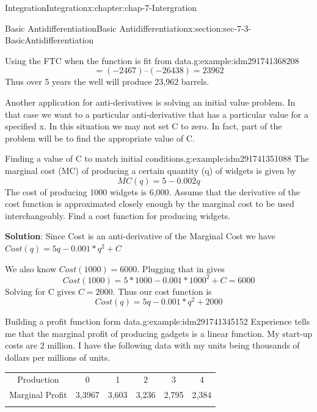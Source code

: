 \documentclass[oneside,10pt,]{book}
\newcommand{\tabularfont}{\relax}
\newcommand{\terminology}[1]{\textbf{#1}}
\numberwithin{equation}{section}
\newcommand{\hrulethin}  {\noalign{\hrule height 0.04em}}
\newcommand{\hrulemedium}{\noalign{\hrule height 0.07em}}
\newcommand{\hrulethick} {\noalign{\hrule height 0.11em}}
\begin{document}
\begin{chapterptx}{Integration}{}{Integration}{}{}{x:chapter:chap-7-Intergration}
\begin{sectionptx}{Basic Antidifferentiation}{}{Basic Antidifferentiation}{}{}{x:section:sec-7-3-BasicAntidifferentiation}
\begin{example}{Using the FTC when the function is fit from data.}{g:example:idm291741368208}
\begin{equation*}
\end{equation*}
%
\begin{equation*}
= (-2467) – (-26438) = 23962
\end{equation*}
Thus over 5 years the well will produce 23,962 barrels.%
\end{example}
Another application for anti-derivatives is solving an initial value problem.  In that case we want to a particular anti-derivative that has a particular value for a specified x. In this situation we may not set C to zero. In fact, part of the problem will be to find the appropriate value of C.%
\begin{example}{Finding a value of C to match initial conditions.}{g:example:idm291741351088}%
The marginal cost (MC) of producing a certain quantity (q) of widgets is given by%
%
\begin{equation*}
MC(q)=5-0.002 q
\end{equation*}
The cost of producing 1000 widgets is \textdollar{}6,000.  Assume that the derivative of the cost function is approximated closely enough by the marginal cost to be used interchangeably.  Find a cost function for producing widgets.%
\par
\terminology{Solution}: Since Cost is an anti-derivative of the Marginal Cost we have \(Cost(q) = 5q - 0.001*q^2  + C\)%
\par
We also know \(Cost(1000) = 6000\).  Plugging that in gives%
%
\begin{equation*}
Cost(1000)= 5*1000 - 0.001*1000^2  + C=6000
\end{equation*}
Solving for C gives \(C = 2000\).  Thus our cost function is%
%
\begin{equation*}
Cost(q) = 5q - 0.001*q^2  + 2000
\end{equation*}
\end{example}
\begin{example}{Building a profit function form data.}{g:example:idm291741345152}%
Experience tells me that the marginal profit of producing gadgets is a linear function.  My start-up costs are \textdollar{}2 million.  I have the following data with my units being thousands of dollars per millions of units.%
\begin{sidebyside}{1}{0}{0}{0}%
\begin{sbspanel}{1}%
{\centering%
{\tabularfont%
\begin{tabular}{cccccc}\hrulethick
Production&0&1&2&3&4\tabularnewline\hrulethin
Marginal Profit&\textdollar{}3,3967&\textdollar{}3,603&\textdollar{}3,236&\textdollar{}2,795&\textdollar{}2,384\tabularnewline\hrulemedium

\end{tabular}}}
\end{sbspanel}
\end{sidebyside}
\end{example}
\end{sectionptx}
\end{chapterptx}
\end{document}
